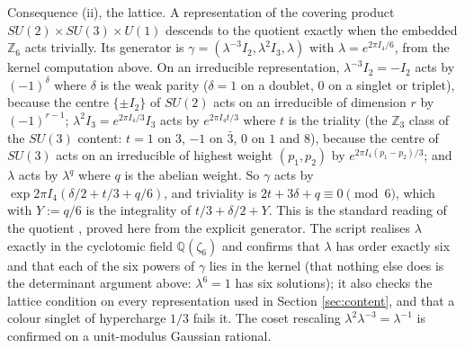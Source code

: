 Consequence (ii), the lattice. A representation of the covering product $SU(2) \times SU(3) \times U(1)$ descends to the quotient exactly when the embedded $\mathbb{Z}_{6}$ acts trivially. Its generator is $\gamma = (\lambda^{-3}I_{2}, \lambda^{2}I_{3}, \lambda)$ with $\lambda = e^{2\pi I_{4}/6}$, from the kernel computation above. On an irreducible representation, $\lambda^{-3}I_{2} = -I_{2}$ acts by $(-1)^{\delta}$ where $\delta$ is the weak parity ($\delta = 1$ on a doublet, $0$ on a singlet or triplet), because the centre $\{\pm I_{2}\}$ of $SU(2)$ acts on an irreducible of dimension $r$ by $(-1)^{r-1}$; $\lambda^{2}I_{3} = e^{2\pi I_{4}/3}I_{3}$ acts by $e^{2\pi I_{4}t/3}$ where $t$ is the triality (the $\mathbb{Z}_{3}$ class of the $SU(3)$ content: $t = 1$ on $3$, $-1$ on $\bar{3}$, $0$ on $1$ and $8$), because the centre of $SU(3)$ acts on an irreducible of highest weight $(p_{1}, p_{2})$ by $e^{2\pi I_{4}(p_{1} - p_{2})/3}$; and $\lambda$ acts by $\lambda^{q}$ where $q$ is the abelian weight. So $\gamma$ acts by $\exp 2\pi I_{4}(\delta/2 + t/3 + q/6)$, and triviality is $2t + 3\delta + q \equiv 0 \pmod 6$, which with $Y := q/6$ is the integrality of $t/3 + \delta/2 + Y$. This is the standard reading of the quotient \cite{BaezHuerta2010, Tong2017}, proved here from the explicit generator. The script realises $\lambda$ exactly in the cyclotomic field $\mathbb{Q}(\zeta_{6})$ and confirms that $\lambda$ has order exactly six and that each of the six powers of $\gamma$ lies in the kernel (that nothing else does is the determinant argument above: $\lambda^{6} = 1$ has six solutions); it also checks the lattice condition on every representation used in Section \ref{sec:content}, and that a colour singlet of hypercharge $1/3$ fails it. The coset rescaling $\lambda^{2}\lambda^{-3} = \lambda^{-1}$ is confirmed on a unit-modulus Gaussian rational.
